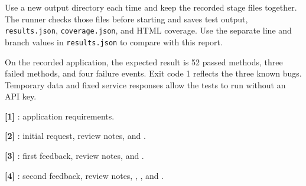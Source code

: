 \documentclass[10pt,letterpaper]{article}
\begin{document}
Use a new output directory each time and keep the recorded stage files together. The runner checks those files before starting and saves test output, \texttt{results.json}, \texttt{coverage.json}, and HTML coverage. Use the separate line and branch values in \texttt{results.json} to compare with this report.

On the recorded application, the expected result is 52 passed methods, three failed methods, and four failure events. Exit code 1 reflects the three known bugs. Temporary data and fixed service responses allow the tests to run without an API key.

{\small\raggedright
\textbf{[1]} : application requirements.

\textbf{[2]} : initial request, review notes, and .

\textbf{[3]} : first feedback, review notes, and .

\textbf{[4]} : second feedback, review notes, , , and .
\par}
\end{document}
